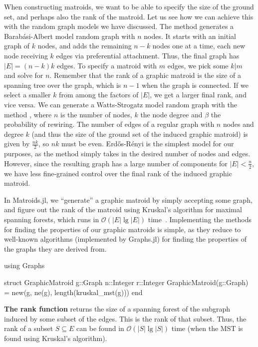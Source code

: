 When constructing matroids, we want to be able to specify the size of the ground set, and perhaps also the rank of the matroid. Let us see how we can achieve this with the random graph models we have discussed. The method  generates a Barabási-Albert model random graph with $n$ nodes. It starts with an initial graph of $k$ nodes, and adds the remaining $n-k$ nodes one at a time, each new node receiving $k$ edges via preferential attachment. Thus, the final graph has $|E| = (n-k)k$ edges. To specify a matroid with $m$ edges, we pick some $k|m$ and solve for $n$. Remember that the rank of a graphic matroid is the size of a spanning tree over the graph, which is $n-1$ when the graph is connected. If we select a smaller $k$ from among the factors of $|E|$, we get a larger final rank, and vice versa. We can generate a Watts-Strogatz model random graph with the method , where $n$ is the number of nodes, $k$ the node degree and $\beta$ the probability of rewiring. The number of edges of a regular graph with $n$ nodes and degree $k$ (and thus the size of the ground set of the induced graphic matroid) is given by $\frac{nk}{2}$, so $nk$ must be even. Erdős-Rényi is the simplest model for our purposes, as the method  simply takes in the desired number of nodes and edges. However, since the resulting graph has a large number of components for $|E| < \frac{n}{2}$, we have less fine-grained control over the final rank of the induced graphic matroid.

In Matroids.jl, we ``generate'' a graphic matroid by simply accepting some graph, and figure out the rank of the matroid using Kruskal's algorithm for maximal spanning forests, which runs in $\mathcal{O}(|E| \lg |E|)$ time~\cite{Cormen2009-zm}. Implementing the methods for finding the properties of our graphic matroids is simple, as they reduce to well-known algorithms (implemented by Graphs.jl) for finding the properties of the graphs they are derived from. 

\begin{jllisting}
using Graphs

struct GraphicMatroid
  g::Graph
  n::Integer
  r::Integer
  GraphicMatroid(g::Graph) = new(g, ne(g), length(kruskal_mst(g)))
end
\end{jllisting}

\textbf{The rank function} returns the size of a spanning forest of the subgraph induced by some subset of the edges. This is the rank of that subset. Thus, the rank of a subset $S \subseteq E$ can be found in $\mathcal{O}(|S| \lg |S|)$ time (when the MST is found using Kruskal's algorithm).

